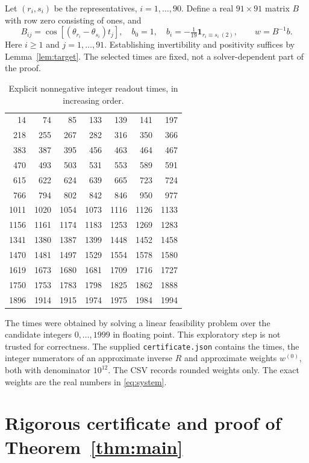 \documentclass[11pt,a4paper]{article}
\begin{document}
Let $(r_i,s_i)$ be the representatives, $i=1,\ldots,90$. Define a real $91\times91$ matrix $B$ with row zero consisting of ones, and
\begin{equation}\label{eq:system}
B_{ij}=\cos[(\theta_{r_i}-\theta_{s_i})t_j],\quad b_0=1,\quad b_i=-\tfrac1{19}\mathbf1_{r_i\equiv s_i\ (2)},\qquad w=B^{-1}b.
\end{equation}
Here $i\ge1$ and $j=1,\ldots,91$. Establishing invertibility and positivity suffices by Lemma~\ref{lem:target}. The selected times are fixed, not a solver-dependent part of the proof.
\begin{table}[htbp]\centering\small
\caption{Explicit nonnegative integer readout times, in increasing order.}\label{tab:times}
\begin{tabular}{rrrrrrr}\toprule
14 & 74 & 85 & 133 & 139 & 141 & 197 \\
218 & 255 & 267 & 282 & 316 & 350 & 366 \\
383 & 387 & 395 & 456 & 463 & 464 & 467 \\
470 & 493 & 503 & 531 & 553 & 589 & 591 \\
615 & 622 & 624 & 639 & 665 & 723 & 724 \\
766 & 794 & 802 & 842 & 846 & 950 & 977 \\
1011 & 1020 & 1054 & 1073 & 1116 & 1126 & 1133 \\
1156 & 1161 & 1174 & 1183 & 1253 & 1269 & 1283 \\
1341 & 1380 & 1387 & 1399 & 1448 & 1452 & 1458 \\
1470 & 1481 & 1497 & 1529 & 1554 & 1578 & 1580 \\
1619 & 1673 & 1680 & 1681 & 1709 & 1716 & 1727 \\
1750 & 1753 & 1783 & 1798 & 1825 & 1862 & 1888 \\
1896 & 1914 & 1915 & 1974 & 1975 & 1984 & 1994 \\
\bottomrule\end{tabular}\end{table}

The times were obtained by solving a linear feasibility problem over the candidate integers $0,\ldots,1999$ in floating point. This exploratory step is not trusted for correctness. The supplied \texttt{certificate.json} contains the times, the integer numerators of an approximate inverse $R$ and approximate weights $w^{(0)}$, both with denominator $10^{12}$. The CSV records rounded weights only. The exact weights are the real numbers in \eqref{eq:system}.
\section{Rigorous certificate and proof of Theorem~\ref{thm:main}}
\end{document}
